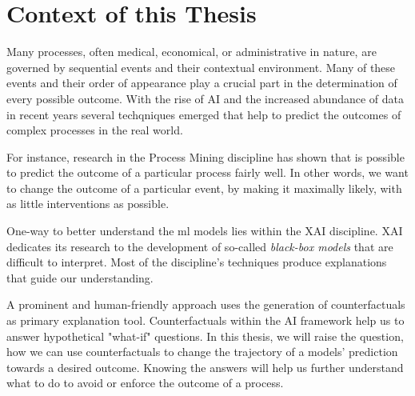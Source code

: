 \section{Context of this Thesis}
Many processes, often medical, economical, or administrative in nature, are governed by sequential events and their contextual environment. Many of these events and their order of appearance play a crucial part in the determination of every possible outcome. With the rise of AI and the increased abundance of data in recent years several techqniques emerged that help to predict the outcomes of complex processes in the real world.

For instance, research in the Process Mining discipline has shown that is possible to predict the outcome of a particular process fairly well\needscite.  In other words, we want to change the outcome of a particular event, by making it maximally likely, with as little interventions as possible. 

One-way to better understand the \gls{ml} models lies within the \gls{XAI} discipline. \gls{XAI} dedicates its research to the  development of so-called \emph{black-box models} that are  difficult to interpret. Most of the discipline's techniques produce explanations that guide our understanding.

A prominent and human-friendly approach uses the generation of counterfactuals as primary explanation tool. Counterfactuals within the AI framework help us to answer hypothetical "what-if" questions. In this thesis, we will raise the question, how we can use counterfactuals to change the trajectory of a models' prediction towards a desired outcome.  
Knowing the answers will help us further understand what to do to avoid or enforce the outcome of a process.